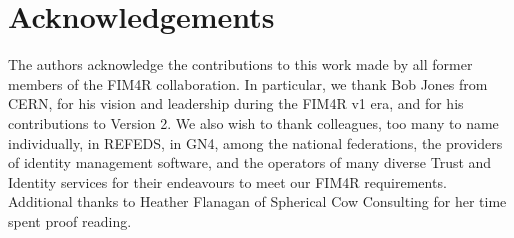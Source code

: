 \documentclass[fleqn,10pt]{wlscirep}
\begin{document}
{\section*{Acknowledgements}
The authors acknowledge the contributions to this work made by all former members of the FIM4R collaboration. In particular, we thank Bob Jones from CERN, for his vision and leadership during the FIM4R v1 era, and for his contributions to Version 2. We also wish to thank colleagues, too many to name individually, in REFEDS, in GN4, among the national federations, the providers of identity management software, and the operators of many diverse Trust and Identity services for their endeavours to meet our FIM4R requirements. Additional thanks to Heather Flanagan of Spherical Cow Consulting for her time spent proof reading.

}
\end{document}
